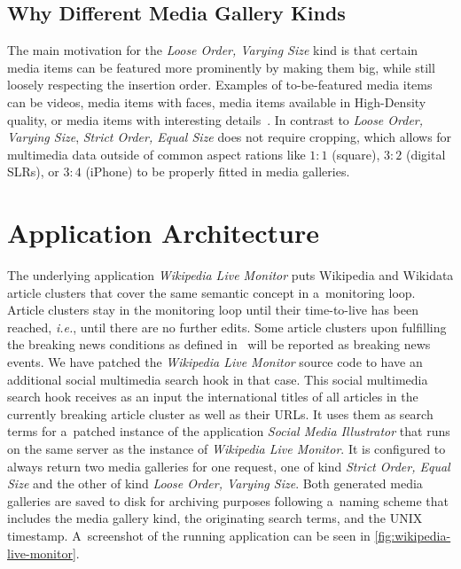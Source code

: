 \documentclass{sig-alternate}
\begin{document}
\subsection{Why Different Media Gallery Kinds}

The main motivation for the \emph{Loose Order, Varying Size} kind
is that certain media items can be featured more prominently
by making them big, while still loosely respecting the insertion order.
Examples of to-be-featured media items can be videos,
media items with faces, media items available in High-Density quality,
or media items with interesting details~\cite{suh2003thumbnail}.
In contrast to \emph{Loose Order, Varying Size},
\emph{Strict Order, Equal Size} does not require cropping,
which allows for multimedia data outside of common aspect rations like
$1{:}1$ (square), $3{:}2$ (digital SLRs), or $3{:}4$ (iPhone)
to be properly fitted in media galleries.

\section{Application Architecture}
\label{sec:application-architecture}
\selectfont

The underlying application \emph{Wikipedia Live Monitor}
puts Wiki\-pedia and Wikidata article clusters
that cover the same semantic concept
in a~monitoring loop.
Article clusters stay in the monitoring loop until
their time-to-live has been reached,
\emph{i.e.}, until there are no further edits.
Some article clusters upon fulfilling the breaking news conditions
as defined in~\cite{steiner2013mjnomore}
will be reported as breaking news events.
We have patched the \emph{Wikipedia Live Monitor} source code
to have an additional social multimedia search hook in that case.
This social multimedia search hook receives as an input
the international titles of all articles
in the currently breaking article cluster as well as their URLs.
It uses them as search terms for a~patched instance
of the application \emph{Social Media Illustrator}
that runs on the same server
as the instance of \emph{Wikipedia Live Monitor}.
It is configured to always return two media galleries
for one request, one of kind \emph{Strict Order, Equal Size}
and the other of kind \emph{Loose Order, Varying Size}.
Both generated media galleries are saved to disk
for archiving purposes following a~naming scheme
that includes the media gallery kind,
the originating search terms, and the UNIX timestamp.
A~screenshot of the running application can be seen in
\autoref{fig:wikipedia-live-monitor}.
\end{document}
